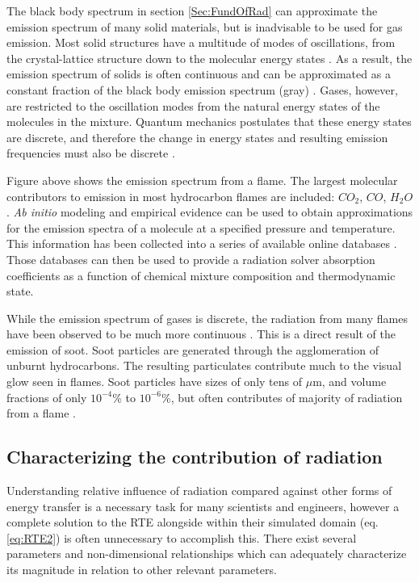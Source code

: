 The black body spectrum in section \ref{Sec:FundOfRad} can approximate the emission spectrum of many solid materials, but is inadvisable to be used for gas emission. 
Most solid structures have a multitude of modes of oscillations, from the crystal-lattice structure down to the molecular energy states \cite{Viskanta1975HeatSolids}. As a result, the emission spectrum of solids is often continuous and can be approximated as a constant fraction of the black body emission spectrum (gray) \cite{Howell2010ThermalTransfer}. 
Gases, however, are restricted to the oscillation modes from the natural energy states of the molecules in the mixture. Quantum mechanics postulates that these energy states are discrete, and therefore the change in energy states and resulting emission frequencies must also be discrete \cite{Hanson2016SpectroscopyGases}.

Figure above shows the emission spectrum from a flame. The largest molecular contributors to emission in most hydrocarbon flames are included: $CO_2$, $CO$, $H_2O$.
\textit{Ab initio} modeling and empirical evidence can be used to obtain approximations for the emission spectra of a molecule at a specified pressure and temperature. This information has been collected into a series of available online databases \cite{Rothman2010HITEMPDatabase}. 
Those databases can then be used to provide a radiation solver absorption coefficients as a function of chemical mixture composition and thermodynamic state.

While the emission spectrum of gases is discrete, the radiation from many flames have been observed to be much more continuous \cite{Modest2013RadiativeTransfer}. This is a direct result of the emission of soot.
Soot particles are generated through the agglomeration of unburnt hydrocarbons. The resulting particulates contribute much to the visual glow seen in flames. 
Soot particles have sizes of only tens of $\mu{}$m, and volume fractions of only $10^{-4}$\% to $10^{-6}$\%, but often contributes of majority of radiation from a flame \cite{Modest2013RadiativeTransfer}.

\subsection{Characterizing the contribution of radiation}
Understanding relative influence of radiation compared against other forms of energy transfer is a necessary task for many scientists and engineers, however a complete solution to the RTE alongside within their simulated domain (eq. \ref{eq:RTE2}) is often unnecessary to accomplish this. 
There exist several parameters and non-dimensional relationships which can adequately characterize its magnitude in relation to other relevant parameters.

